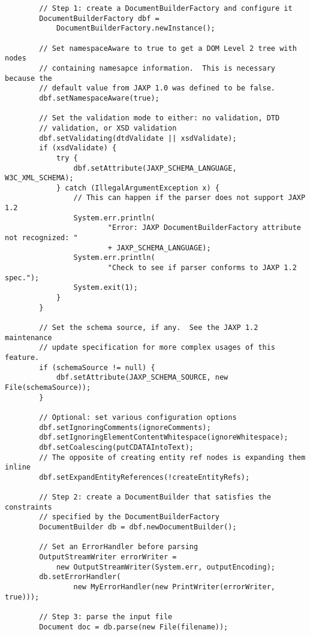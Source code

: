 \documentclass[11pt,english]{article}
\begin{document}
\begin{enumerate}
\begin{lstlisting}
        // Step 1: create a DocumentBuilderFactory and configure it
        DocumentBuilderFactory dbf =
            DocumentBuilderFactory.newInstance();

        // Set namespaceAware to true to get a DOM Level 2 tree with nodes
        // containing namesapce information.  This is necessary because the
        // default value from JAXP 1.0 was defined to be false.
        dbf.setNamespaceAware(true);

        // Set the validation mode to either: no validation, DTD
        // validation, or XSD validation
        dbf.setValidating(dtdValidate || xsdValidate);
        if (xsdValidate) {
            try {
                dbf.setAttribute(JAXP_SCHEMA_LANGUAGE, W3C_XML_SCHEMA);
            } catch (IllegalArgumentException x) {
                // This can happen if the parser does not support JAXP 1.2
                System.err.println(
                        "Error: JAXP DocumentBuilderFactory attribute not recognized: "
                        + JAXP_SCHEMA_LANGUAGE);
                System.err.println(
                        "Check to see if parser conforms to JAXP 1.2 spec.");
                System.exit(1);
            }
        }

        // Set the schema source, if any.  See the JAXP 1.2 maintenance
        // update specification for more complex usages of this feature.
        if (schemaSource != null) {
            dbf.setAttribute(JAXP_SCHEMA_SOURCE, new File(schemaSource));
        }

        // Optional: set various configuration options
        dbf.setIgnoringComments(ignoreComments);
        dbf.setIgnoringElementContentWhitespace(ignoreWhitespace);
        dbf.setCoalescing(putCDATAIntoText);
        // The opposite of creating entity ref nodes is expanding them inline
        dbf.setExpandEntityReferences(!createEntityRefs);

        // Step 2: create a DocumentBuilder that satisfies the constraints
        // specified by the DocumentBuilderFactory
        DocumentBuilder db = dbf.newDocumentBuilder();

        // Set an ErrorHandler before parsing
        OutputStreamWriter errorWriter =
            new OutputStreamWriter(System.err, outputEncoding);
        db.setErrorHandler(
                new MyErrorHandler(new PrintWriter(errorWriter, true)));

        // Step 3: parse the input file
        Document doc = db.parse(new File(filename));


\end{lstlisting}
\end{enumerate}
\end{document}
